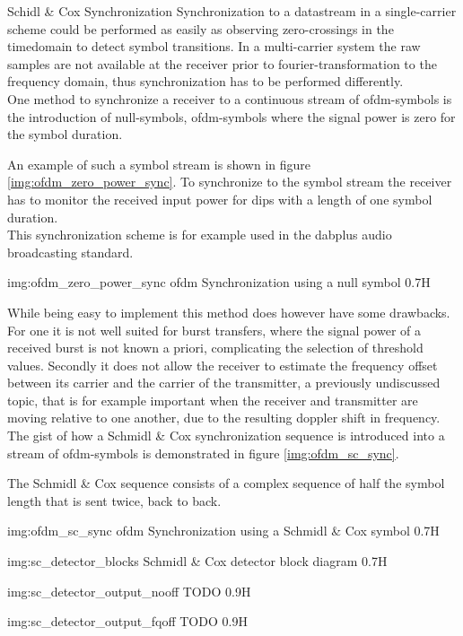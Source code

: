 \begin{subchapter}{Schidl \& Cox Synchronization}
  Synchronization to a datastream in a single-carrier scheme
  could be performed as easily as observing zero-crossings in the
  timedomain to detect symbol transitions.
  In a multi-carrier system the raw samples are not available
  at the receiver prior to fourier-transformation to the
  frequency domain, thus synchronization has to be performed
  differently. \\

  One method to synchronize a receiver to a continuous stream
  of \gls{ofdm}-symbols is the introduction of null-symbols,
  \gls{ofdm}-symbols where the signal power is zero for the
  symbol duration.

  An example of such a symbol stream is shown in figure
  \ref{img:ofdm_zero_power_sync}.
  To synchronize to the symbol stream the receiver has
  to monitor the received input power for dips with a
  length of one symbol duration. \\

  This synchronization scheme is for example used in
  the \acrshort{dabplus} audio broadcasting standard.

               {img:ofdm_zero_power_sync}
               {\acrshort{ofdm} Synchronization using a null symbol}
               {0.7}{H}

  While being easy to implement this method does however
  have some drawbacks.
  For one it is not well suited for burst transfers,
  where the signal power of a received burst is not
  known a priori, complicating the selection of threshold
  values.
  Secondly it does not allow the receiver to estimate the
  frequency offset between its carrier and the carrier of the
  transmitter, a previously undiscussed topic, that is
  for example important when the receiver and transmitter
  are moving relative to one another, due to the resulting doppler
  shift in frequency. \\

  The gist of how a Schmidl \& Cox synchronization sequence
  is introduced into a stream of \gls{ofdm}-symbols is
  demonstrated in figure \ref{img:ofdm_sc_sync}.

  The Schmidl \& Cox sequence consists of a complex sequence
  of half the symbol length that is sent twice, back to back.

               {img:ofdm_sc_sync}
               {\acrshort{ofdm} Synchronization using a Schmidl \& Cox symbol}
               {0.7}{H}

               {img:sc_detector_blocks}
               {Schmidl \& Cox detector block diagram}
               {0.7}{H}

               {img:sc_detector_output_nooff}
               {TODO}
               {0.9}{H}

               {img:sc_detector_output_fqoff}
               {TODO}
               {0.9}{H}
\end{subchapter}
